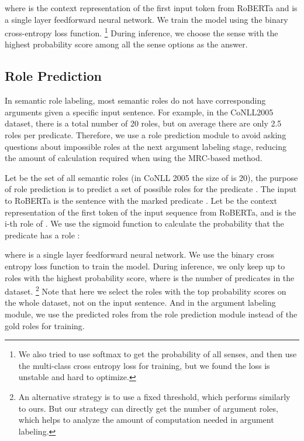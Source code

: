 \documentclass[11pt]{article}
\begin{document}
where  is the context representation of the first input token from RoBERTa and  is a single layer feedforward  neural network. We train the model using the binary cross-entropy loss function. 
\footnote{We also tried to use softmax to get the probability of all senses, and then use the multi-class cross entropy loss for training, but we found the loss is unstable and hard to optimize.}
During inference, we choose the sense with the highest probability score among all the sense options as the answer.
\par

\subsection{Role Prediction}
\label{sec:role}
In semantic role labeling, most semantic roles do not have corresponding arguments given a specific input sentence. For example, in the CoNLL2005 dataset, there is a total number of 20 roles, but on average there are only 2.5 roles per predicate. Therefore, we use a role prediction module to avoid asking questions about impossible roles at the next argument labeling stage, reducing the amount of calculation required when using the MRC-based method.
\par
Let  be the set of all semantic roles (in CoNLL 2005 the size of  is 20), the purpose of role prediction is to predict a set of possible roles  for the predicate . The input to RoBERTa is the sentence   with the marked predicate . Let  be the context representation of the first token of the input sequence from RoBERTa, and  is the i-th role of . We use the sigmoid function to calculate the probability that the predicate  has a role :

where  is a single layer feedforward  neural network. We use the binary cross entropy loss function to train the model. During inference, we only keep up to 
roles with the highest probability score,  where  is the number of predicates in the dataset. 
\footnote{An alternative strategy is to use a fixed threshold, which performs similarly to ours. But our strategy can directly get the number of argument roles, which helps to analyze the amount of computation needed in argument labeling.}
Note that here we select the roles with the top  probability scores on the whole dataset, not on the input sentence. And in the argument labeling module, we use the predicted roles from the role prediction module instead of the gold roles for training.
\end{document}
